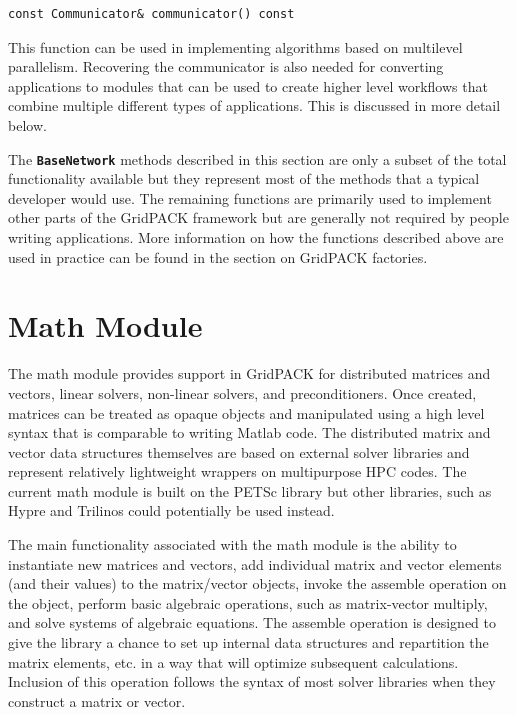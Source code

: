 \documentclass[12pt]{report} %
\begin{document}
{
\color{red}
\begin{Verbatim}[fontseries=b]
const Communicator& communicator() const
\end{Verbatim}
}

This function can be used in implementing algorithms based on multilevel parallelism. Recovering the communicator is also needed for converting applications to modules that can be used to create higher level workflows that combine multiple different types of applications. This is discussed in more detail below.

The \texttt{\textbf{BaseNetwork}} methods described in this section are only a subset of the total functionality available but they represent most of the methods that a typical developer would use. The remaining functions are primarily used to implement other parts of the GridPACK framework but are generally not required by people writing applications. More information on how the functions described above are used in practice can be found in the section on GridPACK factories.

\section{Math Module}

The math module provides support in GridPACK for distributed matrices and vectors, linear solvers, non-linear solvers, and preconditioners. Once created, matrices can be treated as opaque objects and manipulated using a high level syntax that is comparable to writing Matlab code. The distributed matrix and vector data structures themselves are based on external solver libraries and represent relatively lightweight wrappers on multipurpose HPC codes. The current math module is built on the PETSc library but other libraries, such as Hypre and Trilinos could potentially be used instead.

The main functionality associated with the math module is the ability to instantiate new matrices and vectors, add individual matrix and vector elements (and their values) to the matrix/vector objects, invoke the assemble operation on the object, perform basic algebraic operations, such as matrix-vector multiply, and solve systems of algebraic equations. The assemble operation is designed to give the library a chance to set up internal data structures and repartition the matrix elements, etc. in a way that will optimize subsequent calculations. Inclusion of this operation follows the syntax of most solver libraries when they construct a matrix or vector. 
\end{document}

